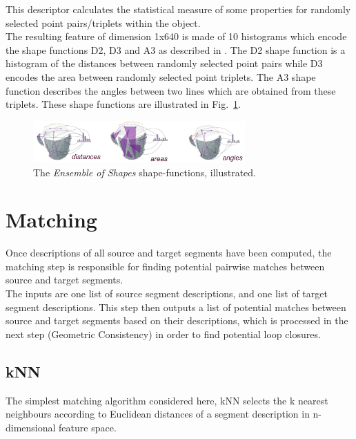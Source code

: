 This descriptor calculates the statistical measure of some properties for randomly selected point pairs/triplets within the object.\\

The resulting feature of dimension 1x640 is made of 10 histograms which encode the shape functions D2, D3 and A3 as described in \citet{wohlkinger2011ensemble}.
%
The D2 shape function is a histogram of the distances between randomly selected point pairs while D3 encodes the area between randomly selected point triplets.
%
The A3 shape function describes the angles between two lines which are obtained from these triplets. These shape functions are illustrated in Fig.~\ref{fig:eos}.

\begin{figure}
  \centering
  \includegraphics[width=3.2in]{images/eos.png}
  \caption{The \textit{Ensemble of Shapes} shape-functions, illustrated.}
  \label{fig:eos}
\end{figure}

\section{Matching}
\label{sec:matching}

Once descriptions of all source and target segments have been computed, the matching step is responsible for finding potential pairwise matches between source and target segments.\\ 

The inputs are one list of source segment descriptions, and one list of target segment descriptions. This step then outputs a list of potential matches between source and target segments based on their descriptions, which is processed in the next step (Geometric Consistency) in order to find potential loop closures.\\

\subsection{kNN}
\label{subsec:kNN}

The simplest matching algorithm considered here, kNN selects the k nearest neighbours according to Euclidean distances of a segment description in n-dimensional feature space.\\

